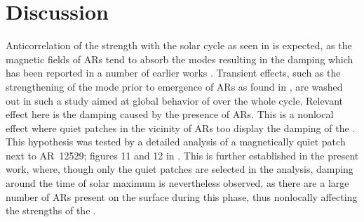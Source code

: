 \documentclass{aa}
\begin{document}

\section{Discussion}

Anticorrelation of the \fff strength with the solar cycle as seen in 
is expected, as the magnetic fields of ARs tend to absorb the modes resulting in the
\fff damping which has been reported in a number of earlier works
\citep{Cally+94,CB97,SRB16}. Transient effects, such as the strengthening of the mode
prior to emergence of ARs as found in \citet{SRB16}, are washed out in such a study aimed
at global behavior of \fff over the whole cycle. Relevant effect here is the damping
caused by the presence of ARs. This is a nonlocal effect where quiet patches in the
vicinity of ARs too display the damping of the \fff. This hypothesis was tested
by a detailed analysis of a magnetically quiet patch next to AR~12529; figures 11 and 12
in \citet{SRB16}. This is further established in the present work, where, though only the
quiet patches are selected in the analysis, damping around the time of solar maximum is
nevertheless observed, as there are a large number of ARs present on the surface during this
phase, thus nonlocally affecting the strengths of the \fff.
\end{document}

